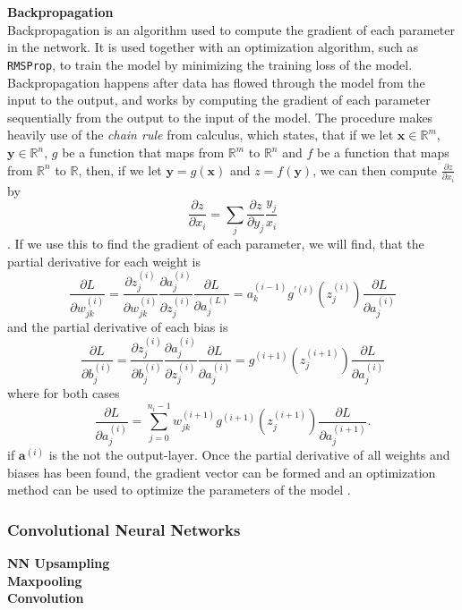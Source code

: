 \documentclass[./main.tex]{subfiles}
\begin{document}
\\
\\
\noindent \textbf{Backpropagation} \\
Backpropagation is an algorithm used to compute the gradient of each parameter in the network. It is used together with an optimization algorithm, such as \texttt{RMSProp}, to train the model by minimizing the training loss of the model. Backpropagation happens after data has flowed through the model from the input to the output, and works by computing the gradient of each parameter sequentially from the output to the input of the model. The procedure makes heavily use of the \textit{chain rule} from calculus, which states, that if we let $\bm{x} \in \mathbb{R}^m$, $\bm{y} \in \mathbb{R}^n$, $g$ be a function that maps from $\mathbb{R}^m$ to $\mathbb{R}^n$ and $f$ be a function that maps from $\mathbb{R}^n$ to $\mathbb{R}$, then, if we let $\bm{y} = g(\bm{x})$ and $z = f(\bm{y})$, we can then compute $\frac{\partial z}{\partial x_i}$ by
$$\frac{\partial z}{\partial x_i} = \sum_j \frac{\partial z}{\partial y_j} \frac{y_j}{x_i}$$
\cite{DeepLearning}. If we use this to find the gradient of each parameter, we will find, that the partial derivative for each weight is
$$\frac{\partial L}{\partial w_{jk} ^{(i)}} = \frac{\partial z_j ^{(i)}}{\partial w_{jk} ^{(i)}} \frac{\partial a_j ^{(i)}}{\partial z_j ^{(i)}} \frac{\partial L}{\partial a_j ^{(L)}} = a_k ^{(i - 1)} g ^{\prime (i)} \left( z_j ^{(i)} \right) \frac{\partial L}{\partial a_j ^{(i)}}$$
and the partial derivative of each bias is
$$\frac{\partial L}{\partial b^{(i)} _j} = \frac{\partial z^{(i)} _j}{\partial b^{(i)} _j} \frac{\partial a_j ^{(i)}}{\partial z^{(i)} _j} \frac{\partial L}{\partial a_j ^{(i)}} = g^{(i + 1)} \left( z_j ^{(i + 1)} \right) \frac{\partial L}{\partial a_j ^{(i)}}$$
where for both cases
$$ \frac{\partial L}{\partial a_j ^{(i)}} = \sum_{j = 0} ^{n_i - 1} w_{jk} ^{(i + 1)} g^{(i + 1)} \left( z_j ^{(i + 1)} \right) \frac{\partial L}{\partial a_j ^{(i + 1)}}.$$
if $\bm{a}^{(i)}$ is the not the output-layer. Once the partial derivative of all weights and biases has been found, the gradient vector can be formed and an optimization method can be used to optimize the parameters of the model \cite{3b1b_4}.


\subsubsection{Convolutional Neural Networks}
\textbf{NN Upsampling} \\
\textbf{Maxpooling} \\
\textbf{Convolution}
\end{document}
